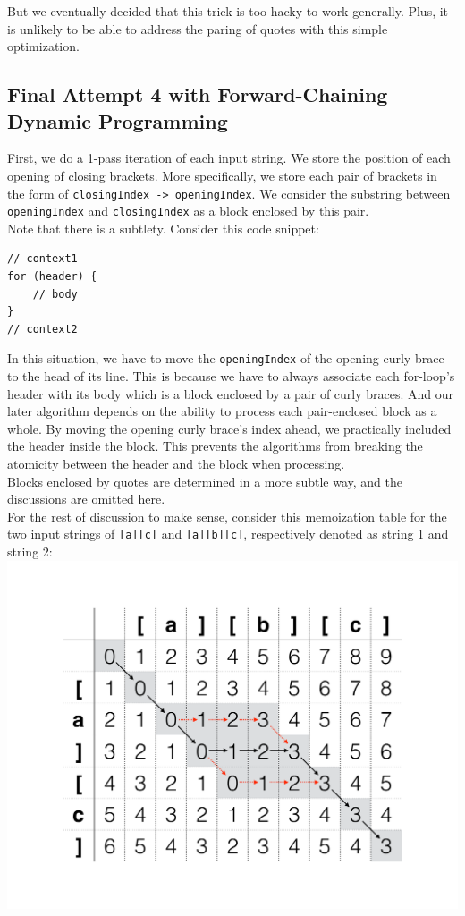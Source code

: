 \documentclass{article}
\begin{document}
But we eventually decided that this trick is too hacky to work generally. Plus, it is unlikely to be able to address the paring of quotes with this simple optimization.

\subsection{Final Attempt 4 with Forward-Chaining Dynamic Programming}
First, we do a 1-pass iteration of each input string. We store the position of each opening of closing brackets. More specifically, we store each pair of brackets in the form of \texttt{closingIndex -> openingIndex}. We consider the substring between \texttt{openingIndex} and \texttt{closingIndex} as a block enclosed by this pair. \\

Note that there is a subtlety. Consider this code snippet:
\begin{lstlisting}
// context1
for (header) {
    // body
}
// context2
\end{lstlisting}
In this situation, we have to move the \texttt{openingIndex} of the opening curly brace to the head of its line. This is because we have to always associate each for-loop's header with its body which is a block enclosed by a pair of curly braces. And our later algorithm depends on the ability to process each pair-enclosed block as a whole. By moving the opening curly brace's index ahead, we practically included the header inside the block. This prevents the algorithms from breaking the atomicity between the header and the block when processing.\\

Blocks enclosed by quotes are determined in a more subtle way, and the discussions are omitted here. \\

For the rest of discussion to make sense, consider this memoization table for the two input strings of \texttt{[a][c]} and \texttt{[a][b][c]}, respectively denoted as string 1 and string 2:\\
\includegraphics[scale=0.5,center]{2.pdf}\\
\end{document}
